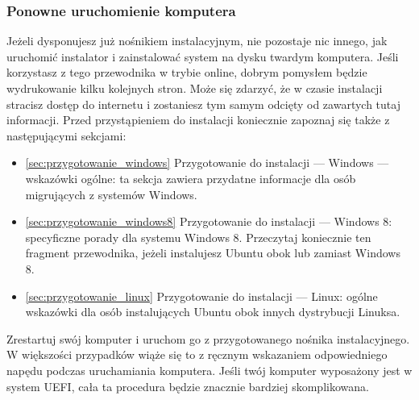 \subsubsection{Ponowne uruchomienie komputera}
Jeżeli dysponujesz już  nośnikiem instalacyjnym, nie pozostaje nic innego, jak uruchomić instalator i zainstalować system na dysku twardym komputera. Jeśli korzystasz z tego przewodnika w trybie online, dobrym pomysłem będzie wydrukowanie kilku kolejnych stron. Może się zdarzyć, że w czasie instalacji stracisz dostęp do internetu i zostaniesz tym samym odcięty od zawartych tutaj informacji.
Przed przystąpieniem do instalacji koniecznie zapoznaj się także z następującymi sekcjami:
\begin{itemize}
\item \ref{sec:przygotowanie_windows} \textcolor{ubuntu_orange}{Przygotowanie do instalacji --- Windows --- wskazówki ogólne}: ta sekcja zawiera przydatne informacje dla osób migrujących z systemów Windows.
\item \ref{sec:przygotowanie_windows8} \textcolor{ubuntu_orange}{Przygotowanie do instalacji --- Windows 8}: specyficzne porady dla systemu Windows 8. Przeczytaj koniecznie ten fragment przewodnika, jeżeli instalujesz Ubuntu obok lub zamiast Windows 8.
\item \ref{sec:przygotowanie_linux} \textcolor{ubuntu_orange}{Przygotowanie do instalacji --- Linux}: ogólne wskazówki dla osób instalujących Ubuntu obok innych dystrybucji Linuksa.
\end{itemize}

Zrestartuj swój komputer i uruchom go z przygotowanego nośnika instalacyjnego. W większości przypadków wiąże się to z ręcznym wskazaniem odpowiedniego napędu podczas uruchamiania komputera. Jeśli twój komputer wyposażony jest w system UEFI, cała ta procedura będzie znacznie bardziej skomplikowana.
